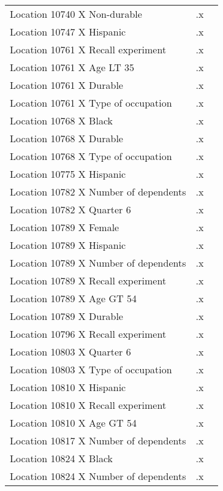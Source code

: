 \begin{tabular}{l*{2}{c}}
Location 10740 X Non-durable&          .x&            \\
Location 10747 X Hispanic&          .x&            \\
Location 10761 X Recall experiment&          .x&            \\
Location 10761 X Age LT 35&          .x&            \\
Location 10761 X Durable&          .x&            \\
Location 10761 X Type of occupation&          .x&            \\
Location 10768 X Black&          .x&            \\
Location 10768 X Durable&          .x&            \\
Location 10768 X Type of occupation&          .x&            \\
Location 10775 X Hispanic&          .x&            \\
Location 10782 X Number of dependents&          .x&            \\
Location 10782 X Quarter 6&          .x&            \\
Location 10789 X Female&          .x&            \\
Location 10789 X Hispanic&          .x&            \\
Location 10789 X Number of dependents&          .x&            \\
Location 10789 X Recall experiment&          .x&            \\
Location 10789 X Age GT 54&          .x&            \\
Location 10789 X Durable&          .x&            \\
Location 10796 X Recall experiment&          .x&            \\
Location 10803 X Quarter 6&          .x&            \\
Location 10803 X Type of occupation&          .x&            \\
Location 10810 X Hispanic&          .x&            \\
Location 10810 X Recall experiment&          .x&            \\
Location 10810 X Age GT 54&          .x&            \\
Location 10817 X Number of dependents&          .x&            \\
Location 10824 X Black&          .x&            \\
Location 10824 X Number of dependents&          .x&            \\

\end{tabular}
